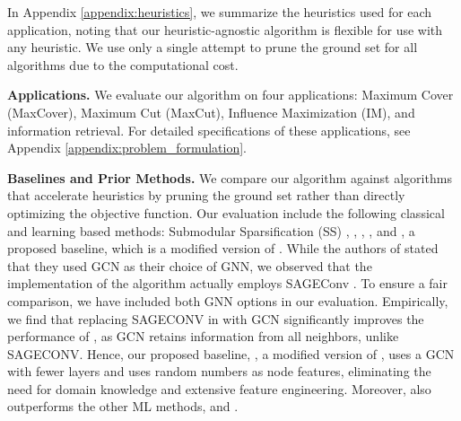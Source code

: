 
In Appendix  \ref{appendix:heuristics},  we summarize the heuristics used for each application, noting that our heuristic-agnostic algorithm is flexible for use with any heuristic. We use only a single attempt to prune the ground set for all algorithms due to the computational cost.


 \textbf{Applications.} %
We evaluate our algorithm on four applications: Maximum Cover (MaxCover), Maximum Cut (MaxCut), Influence Maximization (IM), and information retrieval. For detailed specifications of these applications, see Appendix \ref{appendix:problem_formulation}.




\textbf{Baselines and Prior Methods.} We compare our algorithm against algorithms that accelerate heuristics by pruning the ground set rather than directly optimizing the objective function. Our evaluation include the following classical and learning based methods: Submodular Sparsification (SS) \citep{zhou2017scaling}, \gcomb{} \citep{manchanda2020gcomb}, \lense{} \citep{ireland2022lense}, \comb{} \citep{tian2024combhelper}, and \gnn{}, a proposed baseline, which is a modified version of \comb{}. While the authors of \comb{} stated that they used GCN \citep{kipf2016semi} as their choice of GNN, we observed that the implementation of the algorithm actually employs SAGEConv \citep{hamilton2017inductive}. To ensure a fair comparison, we have included both GNN options in our evaluation. Empirically, we find that replacing SAGECONV  in \comb{} with GCN  significantly improves the performance of \comb{}, as GCN retains information from all neighbors, unlike SAGECONV. Hence, our proposed baseline, \gnn, a modified version of \comb{}, uses a GCN with fewer layers and  uses random numbers as node features, eliminating the need for domain knowledge and extensive feature engineering. Moreover,  \gnn also outperforms the other ML methods, \lense{} and \gcomb{}.
 
